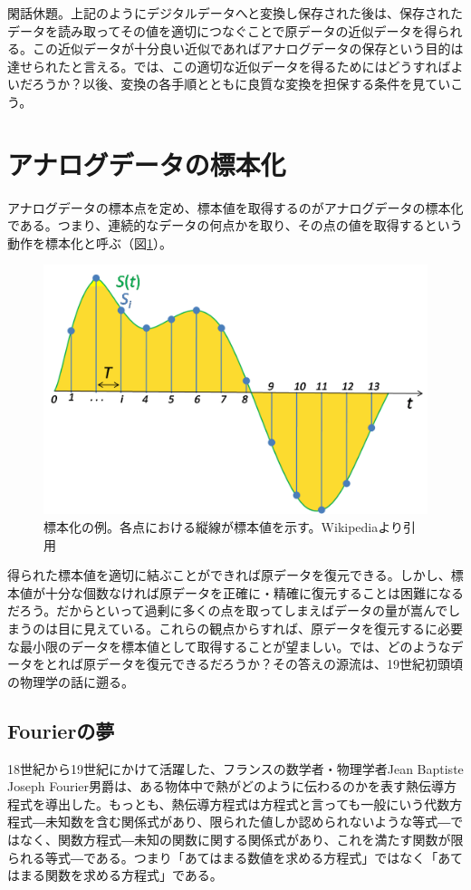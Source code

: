 閑話休題。上記のようにデジタルデータへと変換し保存された後は、保存されたデータを読み取ってその値を適切につなぐことで原データの近似データを得られる。この近似データが十分良い近似であればアナログデータの保存という目的は達せられたと言える。では、この適切な近似データを得るためにはどうすればよいだろうか？以後、変換の各手順とともに良質な変換を担保する条件を見ていこう。

\section{アナログデータの標本化}

アナログデータの標本点を定め、標本値を取得するのがアナログデータの標本化である。つまり、連続的なデータの何点かを取り、その点の値を取得するという動作を標本化と呼ぶ（図\ref{fig2_3}）。

\begin{figure}[htbp]
\centering
\includegraphics[width=0.6\linewidth,keepaspectratio,bb=0 0 1107 718]{fig/fig2_3.png}
\caption{標本化の例。各点における縦線が標本値を示す。Wikipediaより引用}\label{fig2_3}
\end{figure}

得られた標本値を適切に結ぶことができれば原データを復元できる。しかし、標本値が十分な個数なければ原データを正確に・精確に復元することは困難になるだろう。だからといって過剰に多くの点を取ってしまえばデータの量が嵩んでしまうのは目に見えている。これらの観点からすれば、原データを復元するに必要な最小限のデータを標本値として取得することが望ましい。では、どのようなデータをとれば原データを復元できるだろうか？その答えの源流は、19世紀初頭頃の物理学の話に遡る。

\subsection{Fourierの夢}

18世紀から19世紀にかけて活躍した、フランスの数学者・物理学者Jean Baptiste Joseph Fourier男爵は、ある物体中で熱がどのように伝わるのかを表す熱伝導方程式を導出した。もっとも、熱伝導方程式は方程式と言っても一般にいう代数方程式―未知数を含む関係式があり、限られた値しか認められないような等式―ではなく、関数方程式―未知の関数に関する関係式があり、これを満たす関数が限られる等式―である。つまり「あてはまる数値を求める方程式」ではなく「あてはまる関数を求める方程式」である。

